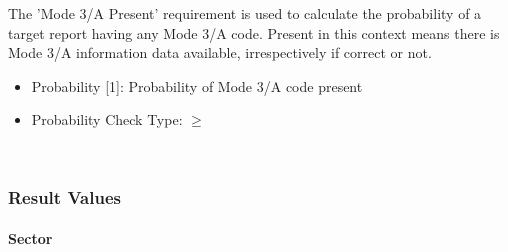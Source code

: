 The 'Mode 3/A Present' requirement is used to calculate the probability of a target report having any Mode 3/A code. Present in this context means there is Mode 3/A information data available, irrespectively if correct or not. \\

\begin{itemize}  
\item Probability [1]: Probability of Mode 3/A code present
\item Probability Check Type: $\geq$
\end{itemize}
\ \\

\subsubsection{Result Values}

\paragraph{Sector}


